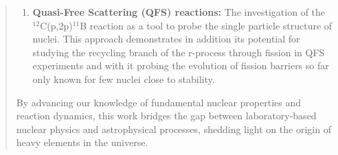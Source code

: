 \documentclass[12pt, a4paper]{article}
\begin{document}
\begin{abstract}
\begin{enumerate}
\item \textbf{Quasi-Free Scattering (QFS) reactions:} The investigation of the $^{12}$C(p,2p)$^{11}$B reaction as a tool to probe the single particle structure of nuclei. This approach demonstrates in addition its potential for studying the recycling branch of the r-process through fission in QFS experiments and with it probing the evolution of fission barriers so far only known for few nuclei close to stability. 
\end{enumerate}
By advancing our knowledge of fundamental nuclear properties and reaction dynamics, this work bridges the gap between laboratory-based nuclear physics and astrophysical processes, shedding light on the origin of heavy elements in the universe.
\end{abstract}
\end{document}
